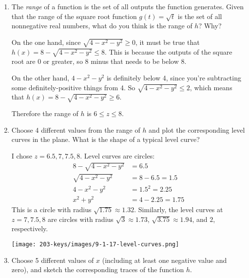 \documentclass[10pt]{article}
\newenvironment{red}{\color{red}}{\ignorespacesafterend}
\begin{document}
\begin{enumerate}[leftmargin=0pt]
\begin{enumerate}
        \item The \textit{range} of a function is the set of all outputs the function generates. Given that the range of the square root function $g(t) = \sqrt{t}$ is the set of all nonnegative real numbers, what do you think is the range of $h$? Why?

        \begin{red}
            On the one hand, since $\sqrt{4-x^2-y^2} \geq 0$, it must be true that $h(x) = 8-\sqrt{4-x^2-y^2} \leq 8$. This is because the outputs of the square root are 0 or greater, so 8 minus that needs to be below 8.

            On the other hand, $4-x^2-y^2$ is definitely below 4, since you're subtracting some definitely-positive things from 4. So $\sqrt{4-x^2-y^2} \leq 2$, which means that $h(x) = 8 - \sqrt{4-x^2-y^2} \geq 6$.

            Therefore the range of $h$ is $6 \leq z \leq 8$.
        \end{red}

        \item Choose 4 different values from the range of $h$ and plot the corresponding level curves in the plane. What is the shape of a typical level curve?

        \begin{red}
            I chose $z = 6.5, 7, 7.5, 8$. Level curves are circles:
            \begin{align*}
                8 - \sqrt{4-x^2-y^2} &= 6.5 \\
                \sqrt{4-x^2-y^2} &= 8 - 6.5 = 1.5 \\
                4 - x^2 - y^2 &= 1.5^2 = 2.25 \\
                x^2 + y^2 &= 4 - 2.25 = 1.75
            \end{align*}
            This is a circle with radius $\sqrt{1.75} \approx 1.32. $
            Similarly, the level curves at $z=7, 7.5, 8$ are circles with radius $\sqrt{3} \approx 1.73$, $\sqrt{3.75} \approx 1.94$, and $2$, respectively.
        \end{red}
        \begin{center}
            \texttt{[image: 203-keys/images/9-1-17-level-curves.png]}
        \end{center}
        

        \item Choose 5 different values of $x$ (including at least one negative value and zero), and sketch the corresponding traces of the function $h$.


\end{enumerate}
\end{enumerate}
\end{document}
